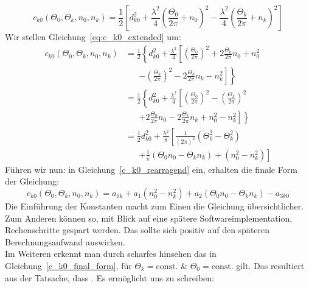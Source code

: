 {\begin{shaded}
\begin{equation}
	c_{k0}(\Theta_0, \Theta_k, n_0, n_k) =\frac{1}{2}\left[d_{k0}^2+\frac{\lambda^2}{4}\left(\frac{\Theta_0}{2\pi}+n_0\right)^2-\frac{\lambda^2}{4}\left(\frac{\Theta_k}{2\pi}+n_k\right)^2\right]
\end{equation}
%
Wir stellen Gleichung~\eqref{eq:c_k0_extended} um:
\begin{align}
%	
	c_{k0}(\Theta_0, \Theta_k, n_0, n_k) &= \frac{1}{2}\left\{d_{k0}^2+\frac{\lambda^2}{4}\left[\left(\frac{\Theta_0}{2\pi}\right)^2+2\frac{\Theta_0}{2\pi}n_0+n_0^2 \right.\right.\nonumber\\
	&\phantom{=}\; 
	\left.\left.-\left(\frac{\Theta_k}{2\pi}\right)^2-2\frac{\Theta_k}{2\pi}n_k-n_k^2\right]\right\}\\
%    
    &=\frac{1}{2}\left\{d_{k0}^2+\frac{\lambda^2}{4}\left[\left(\frac{\Theta_0}{2\pi}\right)^2-\left(\frac{\Theta_k}{2\pi}\right)^2 \right.\right.\nonumber\\
    &\phantom{=}\;
   	\left.\left.+2\frac{\Theta_0}{2\pi}n_0-2\frac{\Theta_k}{2\pi}n_k+n_0^2-n_k^2\right]\right\}\\
%	
	&=\frac{1}{2}d_{k0}^2+\frac{\lambda^2}{8}\left[\frac{1}{(2\pi)^2}\left(\Theta_0^2-\Theta_k^2\right) \right.\nonumber\\
	&\phantom{=}\;
	\left. +\frac{1}{\pi}\left(\Theta_0n_0-\Theta_kn_k\right)+\left(n_0^2-n_k^2\right)\right]\label{c_k0_rearragend}
\end{align}
%
Führen wir nun:
%
in Gleichung~\eqref{c_k0_rearragend} ein, erhalten die finale Form der Gleichung:
\begin{equation}
c_{k0}(\Theta_0, \Theta_k, n_0, n_k) = a_{0k}+a_1(n_0^2-n_k^2)+a_2(\Theta_0n_0-\Theta_kn_k)-a_{3k0}\label{c_k0_final_form}   
\end{equation}
%
Die Einführung der Konstanten macht zum Einen die Gleichung übersichtlicher. Zum Anderen können so, mit Blick auf eine spätere Softwareimplementation, Rechenschritte gespart werden. Das sollte sich positiv auf den späteren Berechnungsaufwand auswirken.\\
%
Im Weiteren erkennt man durch scharfes hinsehen das in Gleichung~\eqref{c_k0_final_form}, für $\Theta_k=\text{const.}$ \& $\Theta_0=\text{const.}$ gilt. Das resultiert aus der Tatsache, dass . Es ermöglicht uns zu schreiben:

\end{shaded}}

